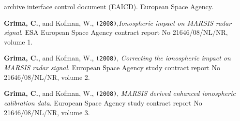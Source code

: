 \begin{etaremune}
  archive interface control document (EAICD). European Space Agency.
\item
  \textbf{Grima, C.}, and Kofman, W., \texttt{(2008)},\emph{Ionospheric
  impact on MARSIS radar signal}. ESA European Space Agency contract
  report No 21646/08/NL/NR, volume 1.
\item
  \textbf{Grima, C.}, and Kofman, W., \texttt{(2008)}, \emph{Correcting
  the ionospheric impact on MARSIS radar signal}. European Space Agency
  study contract report No 21646/08/NL/NR, volume 2.
\item
  \textbf{Grima, C.}, and Kofman, W., \texttt{(2008)}, \emph{MARSIS
  derived enhanced ionospheric calibration data}. European Space Agency
  study contract report No 21646/08/NL/NR, volume 3.
\end{etaremune}
